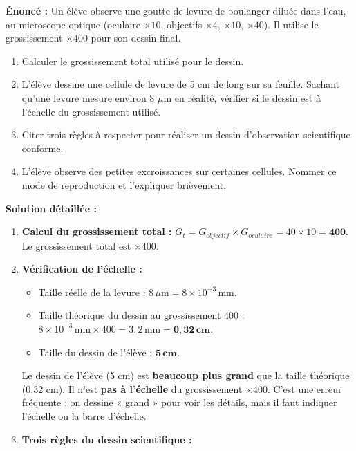 \documentclass[11pt]{article}
\begin{document}
\begin{exoresolu}
    \textbf{Énoncé :} Un élève observe une goutte de levure de boulanger diluée dans l'eau, au microscope optique (oculaire $\times 10$, objectifs $\times 4$, $\times 10$, $\times 40$). Il utilise le grossissement $\times 400$ pour son dessin final.
    \begin{enumerate}
        \item Calculer le grossissement total utilisé pour le dessin.
        \item L'élève dessine une cellule de levure de 5 cm de long sur sa feuille. Sachant qu'une levure mesure environ 8 $\mu$m en réalité, vérifier si le dessin est à l'échelle du grossissement utilisé.
        \item Citer trois règles à respecter pour réaliser un dessin d'observation scientifique conforme.
        \item L'élève observe des petites excroissances sur certaines cellules. Nommer ce mode de reproduction et l'expliquer brièvement.
    \end{enumerate}
    \tcblower
    \textbf{Solution détaillée :}
    \begin{enumerate}
        \item \textbf{Calcul du grossissement total :} $G_t = G_{objectif} \times G_{oculaire} = 40 \times 10 = \mathbf{400}$. Le grossissement total est $\times 400$.
        \item \textbf{Vérification de l'échelle :}
            \begin{itemize}
                \item Taille réelle de la levure : $8 \,\mu\text{m} = 8 \times 10^{-3} \,\text{mm}$.
                \item Taille théorique du dessin au grossissement 400 : $8 \times 10^{-3} \,\text{mm} \times 400 = 3,2 \,\text{mm} = \mathbf{0,32 \,\text{cm}}$.
                \item Taille du dessin de l'élève : $\mathbf{5 \,\text{cm}}$.
            \end{itemize}
            Le dessin de l'élève (5 cm) est \textbf{beaucoup plus grand} que la taille théorique (0,32 cm). Il n'est \textbf{pas à l'échelle} du grossissement $\times 400$. C'est une erreur fréquente : on dessine « grand » pour voir les détails, mais il faut indiquer l'échelle ou la barre d'échelle.
        \item \textbf{Trois règles du dessin scientifique :}
            \begin{enumerate}

\end{enumerate}
\end{enumerate}
\end{exoresolu}
\end{document}
